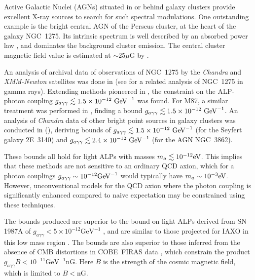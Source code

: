 \documentclass[fleqn,usenatbib,useAMS]{mnras}
\begin{document}
Active Galactic Nuclei (AGNs) situated in or behind galaxy clusters provide excellent X-ray sources to search for such spectral modulations. One outstanding example is the bright central AGN of the Perseus cluster, at the heart of the galaxy NGC~1275.
Its intrinsic spectrum is well described by an absorbed power law \cite{Churazov:2003hr,Yamazaki, Balmaverde2006, Fabian:2015kua}, and dominates the background cluster emission. The central cluster magnetic field value is estimated at $ \sim 25 \mu$G by \cite{0602622}.

An analysis of archival data of observations of NGC~1275 by the {\it Chandra} and {\it XMM-Newton} satellites was done in \cite{Berg:2016ese}
(see \cite{1603.06978} for a related analysis of NGC~1275 in gamma rays).
Extending methods pioneered in \cite{1304.0989}, the constraint on the ALP-photon coupling ${g_{a\gamma\gamma} \lesssim 1.5 \times 10^{-12}~{\rm GeV}^{-1}}$ was found. For M87, a similar treatment was performed in \cite{Marsh:2017yvc}, finding a
bound ${g_{a\gamma\gamma} \lesssim 1.5 \times 10^{-12}~{\rm GeV}^{-1}}$. An analysis of {\it Chandra} data of other bright point sources in galaxy clusters was conducted in (\cite{Conlon:2017qcw}), deriving bounds of ${g_{a\gamma\gamma} \lesssim 1.5 \times 10^{-12}~{\rm GeV}^{-1}}$ (for the Seyfert galaxy 2E~3140) and ${g_{a\gamma\gamma} \lesssim 2.4 \times 10^{-12}~{\rm GeV}^{-1}}$ (for the AGN NGC~3862).


These bounds all hold for light ALPs with masses $m_a \lesssim 10^{-12} {\rm eV}$. This implies that these methods are not sensitive
to an ordinary QCD axion, which for a photon couplings $g_{a\gamma\gamma} \sim 10^{-12} {\rm GeV}^{-1}$ would typically have $m_a \sim 10^{-3} {\rm eV}$. However, unconventional models for the QCD axion where the photon coupling is significantly enhanced compared to naive expectation may
be constrained using these techniques.

The bounds produced are superior to the bound on light ALPs derived from SN 1987A of $g_{a \gamma \gamma} < 5 \times 10^{-12} \text{GeV}^{-1}$ \cite{Payez:2014xsa}, and are similar to those projected for IAXO in this low mass region \cite{Irastorza:2012qf}. The bounds are also superior to those inferred from the absence of CMB distortions in \mbox{COBE FIRAS} data \cite{Mirizzi:2009nq}, which constrain the product $g_{a \gamma \gamma} B < 10^{-11} \text{GeV}^{-1} \text{nG}$. Here $B$ is the strength of the cosmic magnetic field, which is limited to $B<\text{nG}$.
\end{document}
